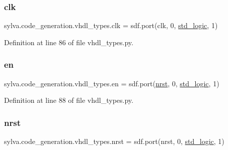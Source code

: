\subsubsection{\texorpdfstring{clk}{clk}}
{\footnotesize\ttfamily sylva.\+code\+\_\+generation.\+vhdl\+\_\+types.\+clk = sdf.\+port(\textquotesingle{}clk\textquotesingle{}, 0, \hyperlink{namespacesylva_1_1code__generation_1_1vhdl__types_a845f43d0f072fe58cc3fbb8a1028cb2e}{std\+\_\+logic}, 1)}



Definition at line 86 of file vhdl\+\_\+types.\+py.

\mbox{\label{namespacesylva_1_1code__generation_1_1vhdl__types_a4da139baa6ee6ea4b41421f259b9ff3b}} 
\subsubsection{\texorpdfstring{en}{en}}
{\footnotesize\ttfamily sylva.\+code\+\_\+generation.\+vhdl\+\_\+types.\+en = sdf.\+port(\textquotesingle{}\hyperlink{namespacesylva_1_1code__generation_1_1vhdl__types_a489fa8436cce610e31ddae7b882063d7}{nrst}\textquotesingle{}, 0, \hyperlink{namespacesylva_1_1code__generation_1_1vhdl__types_a845f43d0f072fe58cc3fbb8a1028cb2e}{std\+\_\+logic}, 1)}



Definition at line 88 of file vhdl\+\_\+types.\+py.

\mbox{\label{namespacesylva_1_1code__generation_1_1vhdl__types_a489fa8436cce610e31ddae7b882063d7}} 
\subsubsection{\texorpdfstring{nrst}{nrst}}
{\footnotesize\ttfamily sylva.\+code\+\_\+generation.\+vhdl\+\_\+types.\+nrst = sdf.\+port(\textquotesingle{}nrst\textquotesingle{}, 0, \hyperlink{namespacesylva_1_1code__generation_1_1vhdl__types_a845f43d0f072fe58cc3fbb8a1028cb2e}{std\+\_\+logic}, 1)}



